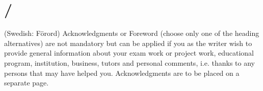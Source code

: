 \section*{/}\label{sec:acknowledgements}
{} 
(Swedish: Förord) Acknowledgments or Foreword (choose only one of the heading alternatives) are not mandatory but can be applied if you as the writer wish to provide general information about your exam work or project work, educational program, institution, business, tutors and personal comments, i.e. thanks to any persons that may have helped you. Acknowledgments are to be placed on a separate page.
